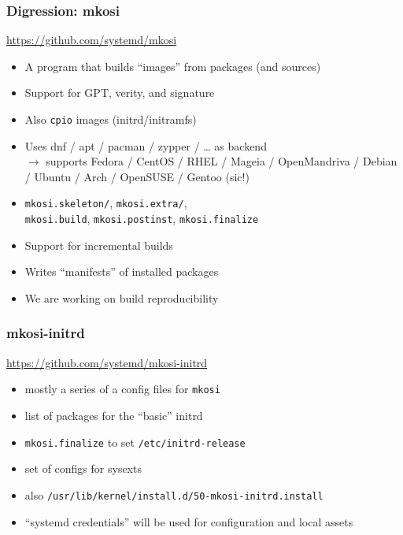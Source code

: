 \documentclass[]{beamer}
\newcommand\pp{}
\begin{document}
\begin{frame}[fragile]
  \frametitle{Digression: mkosi}

  \url{https://github.com/systemd/mkosi}

  \pp

  \begin{itemize}
  \item A program that builds ``images'' from packages (and sources)
    \pp
  \item Support for GPT, verity, and signature
    \pp
  \item Also \texttt{cpio} images (initrd/initramfs)
    \pp
  \item Uses dnf / apt / pacman / zypper / … as backend\\
    \pp
    $\longrightarrow{}$ supports Fedora / CentOS / RHEL / Mageia / OpenMandriva / Debian / Ubuntu / Arch / OpenSUSE / Gentoo (sic!)
    \pp
  \item \texttt{mkosi.skeleton/}, \texttt{mkosi.extra/}, \\
        \texttt{mkosi.build}, \texttt{mkosi.postinst}, \texttt{mkosi.finalize}
    \pp
  \item Support for incremental builds
    \pp
  \item Writes ``manifests'' of installed packages
  \item We are working on build reproducibility
  \end{itemize}
\end{frame}

\begin{frame}[fragile]
  \frametitle{mkosi-initrd}

  \url{https://github.com/systemd/mkosi-initrd}

  \quad

  \pp

  \begin{itemize}
  \item mostly a series of a config files for \texttt{mkosi}
    \pp
  \item list of packages for the ``basic'' initrd
    \pp
  \item \texttt{mkosi.finalize} to set \texttt{/etc/initrd-release}
    \pp
  \item set of configs for sysexts

  \quad

    \pp
  \item also \texttt{/usr/lib/kernel/install.d/50-mkosi-initrd.install}

  \quad
    \pp
  \item ``systemd credentials'' will be used for configuration and local assets
  \end{itemize}
\end{frame}
\end{document}

